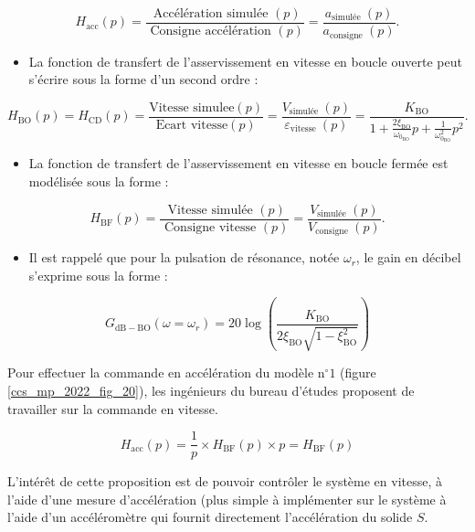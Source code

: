 $$
H_{\mathrm{acc}}(p)=\frac{\text { Accélération simulée }(p)}{\text { Consigne accélération }(p)}=\frac{a_{\text {simulée }}(p)}{a_{\text {consigne }}(p)} .
$$

\begin{itemize}
  \item La fonction de transfert de l'asservissement en vitesse en boucle ouverte peut s'écrire sous la forme d'un second ordre :
\end{itemize}

$$
H_{\mathrm{BO}}(p)=H_{\mathrm{CD}}(p)=\frac{\text{Vitesse simulee}(p)}{\text{Ecart vitesse}(p)}=\frac{V_{\text {simulée }}(p)}{\varepsilon_{\text {vitesse }}(p)}=\frac{K_{\mathrm{BO}}}{1+\frac{2 \xi_{\mathrm{BO}}}{\omega_{0_{\mathrm{BO}}}} p+\frac{1}{\omega_{0_{\mathrm{BO}}}^{2}} p^{2}} .
$$

\begin{itemize}
  \item La fonction de transfert de l'asservissement en vitesse en boucle fermée est modélisée sous la forme :
\end{itemize}

$$
H_{\mathrm{BF}}(p)=\frac{\text { Vitesse simulée }(p)}{\text { Consigne vitesse }(p)}=\frac{V_{\text {simulée }}(p)}{V_{\text {consigne }}(p)} .
$$

\begin{itemize}
  \item Il est rappelé que pour la pulsation de résonance, notée $\omega_{r}$, le gain en décibel s'exprime sous la forme :
\end{itemize}

$$
G_{\mathrm{dB}-\mathrm{BO}}\left(\omega=\omega_{r}\right)=20 \log \left(\frac{K_{\mathrm{BO}}}{2 \xi_{\mathrm{BO}} \sqrt{1-\xi_{\mathrm{BO}}^{2}}}\right)
$$

Pour effectuer la commande en accélération du modèle $\mathrm{n}^{\circ} 1$ (figure \ref{ccs_mp_2022_fig_20}), les ingénieurs du bureau d'études proposent de travailler sur la commande en vitesse.
\fi

\ifprof
\begin{corrige}
$$H_\text{acc}(p) = \dfrac{1}{{p}} \times H_\text{BF}(p) \times {p} = H_\text{BF}(p)$$

L'intérêt de cette proposition est de pouvoir contrôler le système en vitesse, à l'aide d'une mesure d'accélération (plus simple à implémenter sur le système à l'aide d'un accéléromètre qui fournit directement l'accélération du solide $S$.
\end{corrige}
\else
\fi

